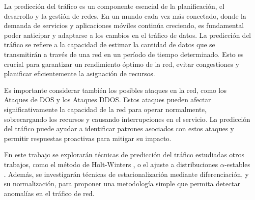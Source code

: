 La predicción del tráfico es un componente esencial de la planificación, el desarrollo y la gestión de redes. 
En un mundo cada vez más conectado, donde la demanda de servicios y aplicaciones móviles continúa creciendo, 
es fundamental poder anticipar y adaptarse a los cambios en el tráfico de datos.
La predicción del tráfico se refiere a la capacidad de estimar la cantidad de datos que se transmitirán 
a través de una red en un período de tiempo determinado. 
Esto es crucial para garantizar un rendimiento óptimo de la red, evitar congestiones y 
planificar eficientemente la asignación de recursos.

Es importante considerar también los posibles ataques en la red, como los Ataques de \ac{DOS}
y los Ataques \ac{DDOS}. Estos ataques pueden afectar significativamente 
la capacidad de la red para operar normalmente, sobrecargando los recursos y causando interrupciones en el servicio. 
La predicción del tráfico puede ayudar a identificar patrones asociados con estos ataques 
y permitir respuestas proactivas para mitigar su impacto.

En este trabajo se explorarán técnicas de predicción del tráfico estudiadas otros trabajos,
como el método de Holt-Winters \cite{cabornero2021}, o el ajuste a distribuciones $\alpha$-estables \cite{benjamin2023}.
Además, se investigarán técnicas de estacionalización mediante diferenciación, y su normalización, para
proponer una metodología simple que permita detectar anomalías en el tráfico de red.
